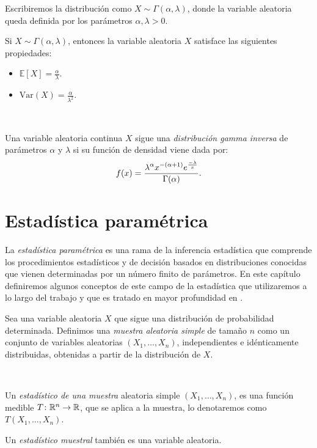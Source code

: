 \documentclass[oneside,openright,titlepage,numbers=noenddot,openany,headinclude,footinclude=true,
cleardoublepage=empty,abstractoff,BCOR=5mm,paper=a4,fontsize=12pt,main=spanish]{scrreprt}
\begin{document}
Escribiremos la distribución como $X \sim \Gamma(\alpha,\lambda)$, donde la variable aleatoria queda definida por los parámetros $\alpha,\lambda > 0$.\\

\begin{proposition}[Propiedades]
Si $X \sim \Gamma(\alpha,\lambda)$, entonces la variable aleatoria $X$ satisface las siguientes propiedades:
\begin{itemize}
    \item $\mathbb{E}[X]=\frac{\alpha}{\lambda}$.
    \item $\text{Var}(X)=\frac{\alpha}{\lambda^2}$.
\end{itemize}
\end{proposition}\

\begin{definition}
Una variable aleatoria continua $X$ sigue una \textit{distribución gamma inversa} de parámetros $\alpha$ y $\lambda$ si su función de densidad viene dada por: $$f(x)=\frac{\displaystyle \lambda^\alpha x^{-(\alpha+1)} e^{\frac{-\lambda}{x}}}{\displaystyle \Gamma(\alpha)}.$$
\end{definition}

\chapter{Estadística paramétrica} \label{ch:estapar}

La \textit{estadística paramétrica} es una rama de la inferencia estadística que comprende los procedimientos estadísticos y de decisión basados en distribuciones conocidas que vienen determinadas por un número finito de parámetros. En este capítulo definiremos algunos conceptos de este campo de la estadística que utilizaremos a lo largo del trabajo y que es tratado en mayor profundidad en \cite{inferencia2012}.\\

\begin{definition}
Sea una variable aleatoria $X$ que sigue una distribución de probabilidad determinada. Definimos una \textit{muestra aleatoria simple} de tamaño $n$ como un conjunto de variables aleatorias $(X_1,\dots,X_n)$, independientes e idénticamente distribuidas, obtenidas a partir de la distribución de $X$.
\end{definition}\

\begin{definition}
Un \textit{estadístico de una muestra} aleatoria simple $(X_1,\dots,X_n)$, es una función medible $T\colon \mathbb{R}^n \to \mathbb{R}$, que se aplica a la muestra, lo denotaremos como $T(X_1,\dots,X_n)$.\\
\begin{remark}
Un \textit{estadístico muestral} también es una variable aleatoria.
\end{remark}
\end{definition}\
\end{document}
